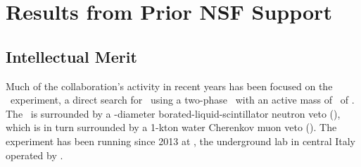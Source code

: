 \section{Results from Prior NSF Support}
\label{sec:priorresults}


\subsection{Intellectual Merit}
\label{sec:PreviousResults-IntellectualMerit}

Much of the collaboration's activity in recent years has been focused on the \DSfs\ experiment, a direct search for \WIMPs\ using a two-phase \LArTPC\ with an active mass of \DSfActiveMass\ of \LAr.  The \LArTPC\ is surrounded by a \LSVStainlessSphereDiameter-diameter borated-liquid-scintillator neutron veto (\LSV), which is in turn surrounded by a 1-kton water Cherenkov muon veto (\WCV).  The experiment has been running since 2013 at \LNGS, the underground lab in central Italy operated by \INFN.

